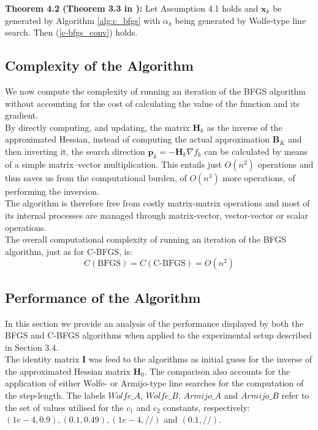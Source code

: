 \documentclass{article}
\numberwithin{equation}{section}
\begin{document}
\textbf{Theorem 4.2 (Theorem 3.3 in \cite{LiFukushimaA}):} Let Assumption 4.1 holds and {$\boldsymbol{x}_k$} be generated by Algorithm \ref{alg:c_bfgs} with $\alpha_k$ being generated by Wolfe-type line search. Then (\ref{c-bfgs_conv}) holds.

\subsection{Complexity of the Algorithm}
We now compute the complexity of running an iteration of the BFGS algorithm without accounting for the cost of calculating the value of the function and its gradient. 
\\

By directly computing, and updating, the matrix $\boldsymbol{H}_k$ as the inverse of the approximated Hessian, instead of computing the actual approximation $\boldsymbol{B}_K$ and then inverting it, the search direction $\boldsymbol{p}_k=-\boldsymbol{H}_k \nabla f_k$ can be calculated by means of a simple matrix–vector multiplication. This entails just $O(n^2)$ operations and thus saves us from the computational burden, of $O(n^3)$ more operations, of performing the inversion.\\

The algorithm is therefore free from costly matrix-matrix operations and most of its internal processes are managed through matrix-vector, vector-vector or scalar operations.\\

The overall computational complexity of running an iteration of the BFGS algorithm, just as for C-BFGS, is:
\begin{equation*}
    C(\text{BFGS}) = C(\text{C-BFGS}) = O(n^2)
\end{equation*}

\subsection{Performance of the Algorithm}
In this section we provide an analysis of the performance displayed by both the BFGS and C-BFGS algorithms when applied to the experimental setup described in Section 3.4. 
\\

The identity matrix $\boldsymbol{I}$ was feed to the algorithms as initial guess for the inverse of the approximated Hessian matrix $\boldsymbol{H}_0$. The comparison also accounts for the application of either Wolfe- or Armijo-type line searches for the computation of the step-length. The labels $Wolfe\_A$, $Wolfe\_B$, $Armijo\_A$ and $Armijo\_B$ refer to the set of values utilised for the $c_1$ and $c_2$ constants, respectively: $(1e-4, 0.9), (0.1, 0.49), (1e-4, //)$ and $(0.1, //)$.
\end{document}

